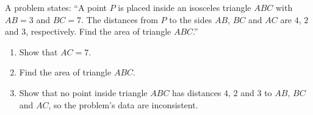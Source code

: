 A problem states: ``A point $P$ is placed inside an isosceles triangle $ABC$ with $AB=3$ and $BC=7$. The distances from $P$ to the sides $AB$, $BC$ and $AC$ are $4$, $2$ and $3$, respectively. Find the area of triangle $ABC$.''
\begin{enumerate}
\item[(a)] Show that $AC=7$.
\item[(b)] Find the area of triangle $ABC$.
\item[(c)] Show that no point inside triangle $ABC$ has distances $4$, $2$ and $3$ to $AB$, $BC$ and $AC$, so the problem's data are inconsistent.
\end{enumerate}
